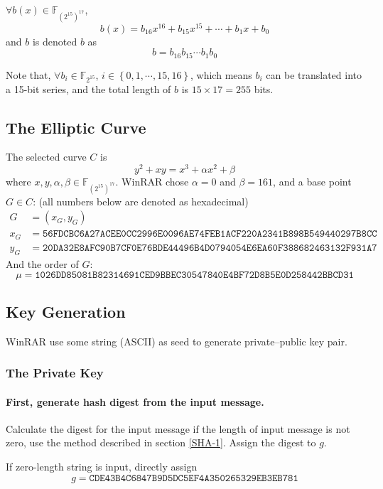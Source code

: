 \documentclass[oneside]{article}
\begin{document}
$\forall b\left(x\right)\in\mathbb{F}_{\left(2^{15}\right)^{17}}$,
\[b\left(x\right)=b_{16}x^{16}+b_{15}x^{15}+\cdots+b_1x+b_0\]
and $b$ is denoted $b$ as
\[b=b_{16}b_{15}\cdots b_1b_0\]

Note that, $\forall b_i\in\mathbb{F}_{2^{15}}$, $i\in\left\{0,1,\cdots,15,16\right\}$, which means $b_i$ can be translated into a 15-bit series, and the total length of $b$ is $15\times 17=255$ bits.

\subsection{The Elliptic Curve}\label{curve}
The selected curve $C$ is
\[y^2+xy=x^3+\alpha x^2+\beta\]
where $x, y, \alpha, \beta\in\mathbb{F}_{\left(2^{15}\right)^{17}}$. WinRAR chose $\alpha=0$ and $\beta=161$, and a base point $G\in C$: (all numbers below are denoted as hexadecimal)
\begin{align*}
      G   & = \left(x_G, y_G\right)                                                     \\
      x_G & = \mathtt{56FDCBC6A27ACEE0CC2996E0096AE74FEB1ACF220A2341B898B549440297B8CC} \\
      y_G & = \mathtt{20DA32E8AFC90B7CF0E76BDE44496B4D0794054E6EA60F388682463132F931A7}
\end{align*}
And the order of $G$:
\[\mu=\mathtt{1026DD85081B82314691CED9BBEC30547840E4BF72D8B5E0D258442BBCD31}\]

\subsection{Key Generation}\label{key-gen}
WinRAR use some string (ASCII) as seed to generate private--public key pair.

\subsubsection{The Private Key}
\paragraph{First, generate hash digest from the input message.}
Calculate the digest for the input message if the length of input message is not zero, use the method described in section \ref{SHA-1}.
Assign the digest to $g$.

If zero-length string is input, directly assign
\[g=\mathtt{CDE43B4C6847B9D5DC5EF4A350265329EB3EB781}\]
\end{document}
